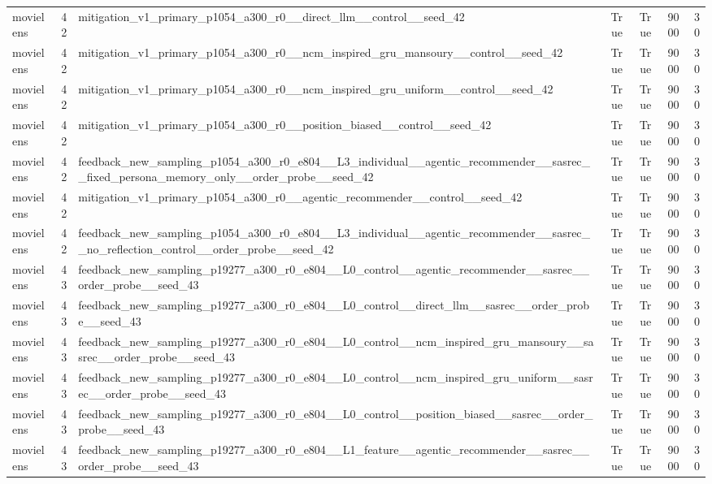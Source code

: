 \begin{table}[htbp!]
\begin{tabular}{lrlrrrr}
movielens & 42 & mitigation\_v1\_primary\_p1054\_a300\_r0\_\_direct\_llm\_\_control\_\_seed\_42 & True & True & 9000 & 30 \\
movielens & 42 & mitigation\_v1\_primary\_p1054\_a300\_r0\_\_ncm\_inspired\_gru\_mansoury\_\_control\_\_seed\_42 & True & True & 9000 & 30 \\
movielens & 42 & mitigation\_v1\_primary\_p1054\_a300\_r0\_\_ncm\_inspired\_gru\_uniform\_\_control\_\_seed\_42 & True & True & 9000 & 30 \\
movielens & 42 & mitigation\_v1\_primary\_p1054\_a300\_r0\_\_position\_biased\_\_control\_\_seed\_42 & True & True & 9000 & 30 \\
movielens & 42 & feedback\_new\_sampling\_p1054\_a300\_r0\_e804\_\_L3\_individual\_\_agentic\_recommender\_\_sasrec\_\_fixed\_persona\_memory\_only\_\_order\_probe\_\_seed\_42 & True & True & 9000 & 30 \\
movielens & 42 & mitigation\_v1\_primary\_p1054\_a300\_r0\_\_agentic\_recommender\_\_control\_\_seed\_42 & True & True & 9000 & 30 \\
movielens & 42 & feedback\_new\_sampling\_p1054\_a300\_r0\_e804\_\_L3\_individual\_\_agentic\_recommender\_\_sasrec\_\_no\_reflection\_control\_\_order\_probe\_\_seed\_42 & True & True & 9000 & 30 \\
movielens & 43 & feedback\_new\_sampling\_p19277\_a300\_r0\_e804\_\_L0\_control\_\_agentic\_recommender\_\_sasrec\_\_order\_probe\_\_seed\_43 & True & True & 9000 & 30 \\
movielens & 43 & feedback\_new\_sampling\_p19277\_a300\_r0\_e804\_\_L0\_control\_\_direct\_llm\_\_sasrec\_\_order\_probe\_\_seed\_43 & True & True & 9000 & 30 \\
movielens & 43 & feedback\_new\_sampling\_p19277\_a300\_r0\_e804\_\_L0\_control\_\_ncm\_inspired\_gru\_mansoury\_\_sasrec\_\_order\_probe\_\_seed\_43 & True & True & 9000 & 30 \\
movielens & 43 & feedback\_new\_sampling\_p19277\_a300\_r0\_e804\_\_L0\_control\_\_ncm\_inspired\_gru\_uniform\_\_sasrec\_\_order\_probe\_\_seed\_43 & True & True & 9000 & 30 \\
movielens & 43 & feedback\_new\_sampling\_p19277\_a300\_r0\_e804\_\_L0\_control\_\_position\_biased\_\_sasrec\_\_order\_probe\_\_seed\_43 & True & True & 9000 & 30 \\
movielens & 43 & feedback\_new\_sampling\_p19277\_a300\_r0\_e804\_\_L1\_feature\_\_agentic\_recommender\_\_sasrec\_\_order\_probe\_\_seed\_43 & True & True & 9000 & 30 \\

\end{tabular}
\end{table}
